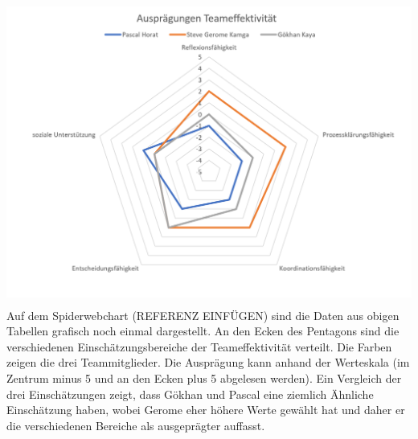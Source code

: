 \includegraphics[height=10cm]{images/AuspraegungenTeameffektivitaet.png}
Auf dem Spiderwebchart (REFERENZ EINFÜGEN) sind die Daten aus obigen Tabellen grafisch noch einmal dargestellt. An den Ecken des Pentagons sind die verschiedenen Einschätzungsbereiche der Teameffektivität verteilt. Die Farben zeigen die drei Teammitglieder. Die Ausprägung kann anhand der Werteskala (im Zentrum minus 5 und an den Ecken plus 5 abgelesen werden).
Ein Vergleich der drei Einschätzungen zeigt, dass Gökhan und Pascal eine ziemlich Ähnliche Einschätzung haben, wobei Gerome eher höhere Werte gewählt hat und daher er die verschiedenen Bereiche als ausgeprägter auffasst.

